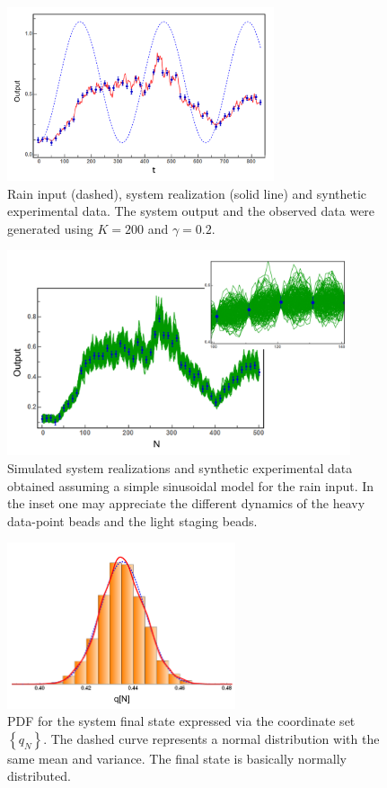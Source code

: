 \documentclass[11pt, a4paper]{article}
\begin{document}
\begin{figure}
    \centering
    \includegraphics[width=0.7\textwidth]{Figs/FigRainData.png}
    \caption{Rain input (dashed), system realization (solid line) and synthetic experimental data. The system output and the observed data were generated using $K=200$ and $\gamma = 0.2$.}
    \label{fig:rain_data_S}
\end{figure}

\begin{figure}
    \centering
    \includegraphics[width=0.9\textwidth]{Figs/FigSpaghetti.png}
    \caption{Simulated system realizations and synthetic experimental data obtained assuming a simple sinusoidal model for the rain input. In the inset one may appreciate the different dynamics of the heavy data-point beads and the light staging beads.}
    \label{fig:spaghetti}
\end{figure}

\begin{figure}
    \centering
    \includegraphics[width=0.6\textwidth]{Figs/FigFinalState.png}
    \caption{PDF for the system final state expressed via the coordinate set $\left\{ q_N \right\}$. The dashed curve represents a normal distribution with the same mean and variance. The final state is basically normally distributed.}
    \label{fig:final_state}
\end{figure}
\end{document}
